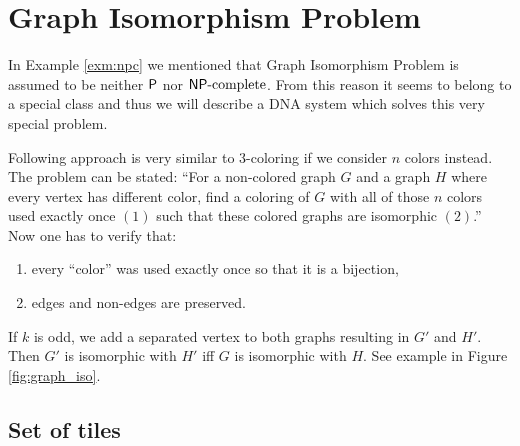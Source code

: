 \section{Graph Isomorphism Problem}

In Example \ref{exm:npc} we mentioned that Graph Isomorphism Problem is assumed to be neither $\P$ nor $\NPC$. From this reason it seems to belong to a special class and thus we will describe a DNA system which solves this very special problem. %

Following approach is very similar to 3-coloring if we consider $n$ colors instead. The problem can be stated: ``For a non-colored graph $G$ and a graph $H$ where every vertex has different color, find a coloring of $G$ with all of those $n$ colors used exactly once $(1)$ such that these colored graphs are isomorphic $(2)$.'' Now one has to verify that:
\begin{enumerate}
	\item every ``color'' was used exactly once so that it is a bijection,
	\item edges and non-edges are preserved.
\end{enumerate}

If $k$ is odd, we add a separated vertex to both graphs resulting in $G'$ and $H'$. Then $G'$ is isomorphic with $H'$ iff $G$ is isomorphic with $H$. See example in Figure \ref{fig:graph_iso}.

\subsection*{Set of tiles}


